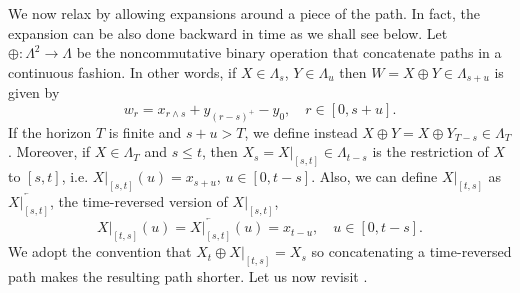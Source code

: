 We now relax  by allowing expansions around a piece of the path. In fact, the expansion can be also done backward in time  as we shall see below. 
Let $\oplus: \Lambda^2 \to \Lambda$ be the noncommutative binary operation that concatenate paths in a continuous fashion. In other words,   if $X\in \Lambda_{s}$, $ Y \in \Lambda_{u}$ then $W = X \oplus Y \in \Lambda_{s+u}$ is given by 
$$ w_r  = x_{r \wedge s} + y_{(r- s)^+}- y_0, \quad  r \in [0,s+u].$$
If the horizon $T$ is finite and $s+u > T$, we define instead $X \oplus Y = X \oplus Y_{T-s} \in \Lambda_T$. %
Moreover, if  $X\in \Lambda_T$ and $ s \le t $, then $X_s = X |_{[s,t]} \in \Lambda_{t-s}$ is  the restriction of $X$  to $[s,t]$, i.e.  $X |_{[s,t]}(u) = x_{s+u}$, $u \in [0,t-s]$. %
Also, we  can define $X |_{[t,s]}$ as $\overleftarrow{X |_{[s,t]}}$,  the time-reversed version of $X |_{[s,t]}$, 
$$X |_{[t,s]}(u) = \overleftarrow{X |_{[s,t]}}(u)  =  x_{t-u} , \quad  u \in [0,t-s]. $$
We adopt the convention that $X_t \oplus X|_{[t,s]} = X_s$ so concatenating a time-reversed path makes the resulting path shorter. %
Let us  now revisit  . 


